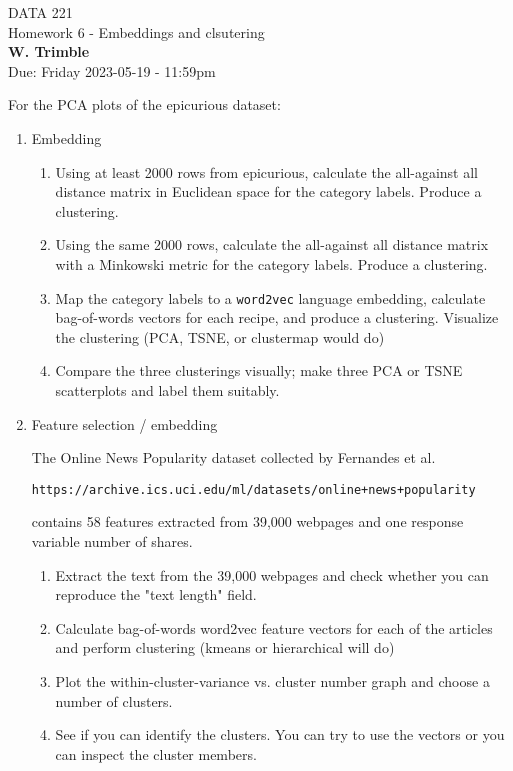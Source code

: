 \documentclass[12pt]{book}
\theoremstyle{definition}
\begin{document}
\begin{center}
{\Large DATA 221 \\  Homework 6  - Embeddings and clsutering}\\
\textbf{W. Trimble}\\ %
Due: Friday 2023-05-19  - 11:59pm
\end{center}

\vspace{0.2 cm}

For the PCA plots of the epicurious dataset:
\begin{enumerate} 

  \item Embedding 
  \begin{enumerate}
    \item Using at least 2000 rows from epicurious, calculate the all-against all distance matrix in Euclidean space for the category labels.  Produce a clustering.
    \item Using the same 2000 rows, calculate the all-against all distance matrix with a Minkowski metric for the category labels.  Produce a clustering.
    \item Map the category labels to a \texttt{word2vec} language embedding, calculate bag-of-words vectors for each recipe, and produce a clustering.   Visualize the clustering (PCA, TSNE, or clustermap would do)
    \item Compare the three clusterings visually; make three PCA or TSNE scatterplots and label them suitably.
  \end{enumerate}

\item  Feature selection / embedding

The Online News Popularity dataset collected by Fernandes et al. 

 \texttt{https://archive.ics.uci.edu/ml/datasets/online+news+popularity} 

contains 58 features extracted from 39,000 webpages and one response variable number of shares.  

\begin{enumerate}
\item  
Extract the text from the 39,000 webpages and check whether you can reproduce the "text length" field.
\item 
Calculate bag-of-words word2vec feature vectors for each of the articles and perform clustering (kmeans or hierarchical will do)
\item 
Plot the within-cluster-variance vs. cluster number graph and choose a number of clusters.
\item 
See if you can identify the clusters.  You can try to use the vectors or you can inspect the cluster members. 

\end{enumerate}

\end{enumerate}
\end{document}
